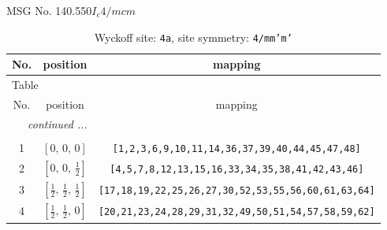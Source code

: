 \documentclass[fleqn,8pt]{jsarticle}
\begin{document}
\setcounter{MaxMatrixCols}{32}

\renewcommand{\tablename}{Table~}
\renewcommand{\figurename}{Figure~}
\begin{center}
\LARGE
MSG No. 140.550\quad$I_{c}4/mcm$
\end{center}
\renewcommand{\arraystretch}{1.2}
\begin{longtable}{ccc}
\caption{Wyckoff site: {\tt 4a}, site symmetry: {\tt 4/mm'm'}}
 \\
 \hline \hline
No. & position & mapping \\ \hline \endfirsthead

\multicolumn{2}{l}{\tablename\ \thetable{}} \\
 \hline \hline
No. & position & mapping \\ \hline \endhead

 \hline \hline
\multicolumn{2}{r}{\footnotesize\it continued ...} \\ \endfoot

 \hline \hline
\multicolumn{2}{r}{} \\ \endlastfoot

1 & $\left[ 0,\, 0,\, 0 \right]$ & {\tt [1,2,3,6,9,10,11,14,36,37,39,40,44,45,47,48]} \\ \hline
2 & $\left[ 0,\, 0,\, \frac{1}{2} \right]$ & {\tt [4,5,7,8,12,13,15,16,33,34,35,38,41,42,43,46]} \\ \hline
3 & $\left[ \frac{1}{2},\, \frac{1}{2},\, \frac{1}{2} \right]$ & {\tt [17,18,19,22,25,26,27,30,52,53,55,56,60,61,63,64]} \\ \hline
4 & $\left[ \frac{1}{2},\, \frac{1}{2},\, 0 \right]$ & {\tt [20,21,23,24,28,29,31,32,49,50,51,54,57,58,59,62]} \\
\end{longtable}
\renewcommand{\arraystretch}{1.2}
\end{document}

